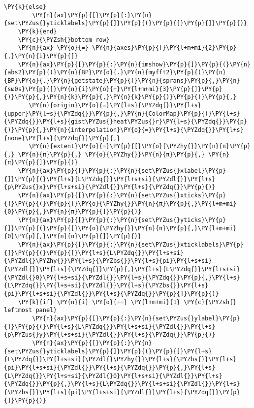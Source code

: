 \begin{Verbatim}[commandchars=\\\{\}]
    \PY{k}{else}
        \PY{n}{ax}\PY{p}{[}\PY{p}{:}\PY{n}{set\PYZus{}yticklabels}\PY{p}{]}\PY{p}{(}\PY{p}{[}\PY{p}{]}\PY{p}{)}
    \PY{k}{end}
    \PY{c}{\PYZsh{}bottom row}
    \PY{n}{ax} \PY{o}{=} \PY{n}{axes}\PY{p}{[}\PY{l+m+mi}{2}\PY{p}{,}\PY{n}{i}\PY{p}{]}
    \PY{n}{ax}\PY{p}{[}\PY{p}{:}\PY{n}{imshow}\PY{p}{]}\PY{p}{(}\PY{n}{abs2}\PY{p}{(}\PY{n}{BP}\PY{o}{.}\PY{n}{myfft2}\PY{p}{(}\PY{n}{BP}\PY{o}{.}\PY{n}{getstate}\PY{p}{(}\PY{n}{sprans}\PY{p}{,}\PY{n}{sω0s}\PY{p}{[}\PY{n}{i}\PY{o}{+}\PY{l+m+mi}{3}\PY{p}{]}\PY{p}{)}\PY{p}{,}\PY{n}{k}\PY{p}{,}\PY{n}{k}\PY{p}{)}\PY{p}{)}\PY{p}{,}
       \PY{n}{origin}\PY{o}{=}\PY{l+s}{\PYZdq{}}\PY{l+s}{upper}\PY{l+s}{\PYZdq{}}\PY{p}{,}\PY{n}{ColorMap}\PY{p}{(}\PY{l+s}{\PYZdq{}}\PY{l+s}{gist\PYZus{}heat\PYZus{}r}\PY{l+s}{\PYZdq{}}\PY{p}{)}\PY{p}{,}\PY{n}{interpolation}\PY{o}{=}\PY{l+s}{\PYZdq{}}\PY{l+s}{none}\PY{l+s}{\PYZdq{}}\PY{p}{,}
       \PY{n}{extent}\PY{o}{=}\PY{p}{[}\PY{o}{\PYZhy{}}\PY{n}{π}\PY{p}{,} \PY{n}{π}\PY{p}{,} \PY{o}{\PYZhy{}}\PY{n}{π}\PY{p}{,} \PY{n}{π}\PY{p}{]}\PY{p}{)}
    \PY{n}{ax}\PY{p}{[}\PY{p}{:}\PY{n}{set\PYZus{}xlabel}\PY{p}{]}\PY{p}{(}\PY{l+s}{L\PYZdq{}}\PY{l+s+si}{\PYZdl{}}\PY{l+s}{p\PYZus{}x}\PY{l+s+si}{\PYZdl{}}\PY{l+s}{\PYZdq{}}\PY{p}{)}
    \PY{n}{ax}\PY{p}{[}\PY{p}{:}\PY{n}{set\PYZus{}xticks}\PY{p}{]}\PY{p}{(}\PY{p}{[}\PY{o}{\PYZhy{}}\PY{n}{π}\PY{p}{,}\PY{l+m+mi}{0}\PY{p}{,}\PY{n}{π}\PY{p}{]}\PY{p}{)}
    \PY{n}{ax}\PY{p}{[}\PY{p}{:}\PY{n}{set\PYZus{}yticks}\PY{p}{]}\PY{p}{(}\PY{p}{[}\PY{o}{\PYZhy{}}\PY{n}{π}\PY{p}{,}\PY{l+m+mi}{0}\PY{p}{,}\PY{n}{π}\PY{p}{]}\PY{p}{)}
    \PY{n}{ax}\PY{p}{[}\PY{p}{:}\PY{n}{set\PYZus{}xticklabels}\PY{p}{]}\PY{p}{(}\PY{p}{[}\PY{l+s}{L\PYZdq{}}\PY{l+s+si}{\PYZdl{}\PYZhy{}}\PY{l+s}{\PYZbs{}}\PY{l+s}{pi}\PY{l+s+si}{\PYZdl{}}\PY{l+s}{\PYZdq{}}\PY{p}{,}\PY{l+s}{L\PYZdq{}}\PY{l+s+si}{\PYZdl{}0}\PY{l+s+si}{\PYZdl{}}\PY{l+s}{\PYZdq{}}\PY{p}{,}\PY{l+s}{L\PYZdq{}}\PY{l+s+si}{\PYZdl{}}\PY{l+s}{\PYZbs{}}\PY{l+s}{pi}\PY{l+s+si}{\PYZdl{}}\PY{l+s}{\PYZdq{}}\PY{p}{]}\PY{p}{)}
    \PY{k}{if} \PY{n}{i} \PY{o}{==} \PY{l+m+mi}{1} \PY{c}{\PYZsh{} leftmost panel}
        \PY{n}{ax}\PY{p}{[}\PY{p}{:}\PY{n}{set\PYZus{}ylabel}\PY{p}{]}\PY{p}{(}\PY{l+s}{L\PYZdq{}}\PY{l+s+si}{\PYZdl{}}\PY{l+s}{p\PYZus{}y}\PY{l+s+si}{\PYZdl{}}\PY{l+s}{\PYZdq{}}\PY{p}{)}
        \PY{n}{ax}\PY{p}{[}\PY{p}{:}\PY{n}{set\PYZus{}yticklabels}\PY{p}{]}\PY{p}{(}\PY{p}{[}\PY{l+s}{L\PYZdq{}}\PY{l+s+si}{\PYZdl{}\PYZhy{}}\PY{l+s}{\PYZbs{}}\PY{l+s}{pi}\PY{l+s+si}{\PYZdl{}}\PY{l+s}{\PYZdq{}}\PY{p}{,}\PY{l+s}{L\PYZdq{}}\PY{l+s+si}{\PYZdl{}0}\PY{l+s+si}{\PYZdl{}}\PY{l+s}{\PYZdq{}}\PY{p}{,}\PY{l+s}{L\PYZdq{}}\PY{l+s+si}{\PYZdl{}}\PY{l+s}{\PYZbs{}}\PY{l+s}{pi}\PY{l+s+si}{\PYZdl{}}\PY{l+s}{\PYZdq{}}\PY{p}{]}\PY{p}{)}

\end{Verbatim}
